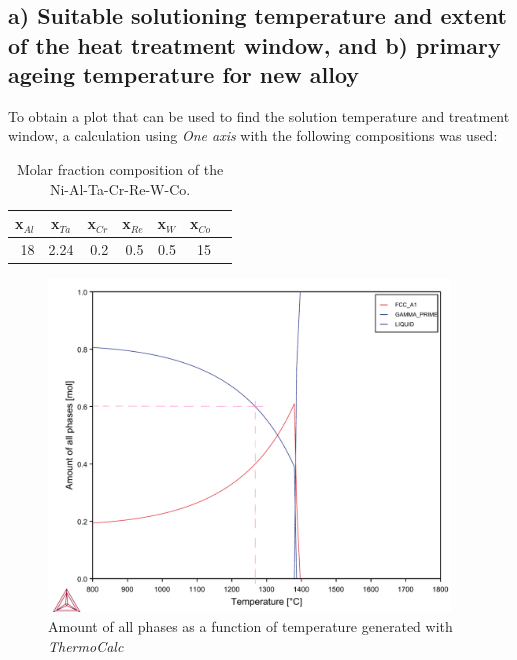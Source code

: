 \section{}

\subsection{a) Suitable solutioning temperature and extent of the heat treatment window, and b) primary ageing temperature for new alloy}

To obtain a plot that can be used to find the solution temperature and treatment window, a calculation using \textit{One axis} with the following compositions was used:

\begin{table}[h]
  \centering
  \begin{tabular}{rrrrrrr}
    \multicolumn{1}{c}{x$_{Al}$} & \multicolumn{1}{c}{x$_{Ta}$} & \multicolumn{1}{c}{x$_{Cr}$} & \multicolumn{1}{c}{x$_{Re}$} & \multicolumn{1}{c}{x$_{W}$} & \multicolumn{1}{c}{x$_{Co}$} \\ \hline \hline
    18 & 2.24 & 0.2 & 0.5 & 0.5 & 15
  \end{tabular}
  \caption{Molar fraction composition of the Ni-Al-Ta-Cr-Re-W-Co.}
  \label{tab:tab06}
\end{table}

\begin{figure}[h]
  \centering
    \includegraphics[width=0.95\textwidth]{graficas/Q4_02_1.png}
    \caption{Amount of all phases as a function of temperature generated with \textit{ThermoCalc} \citep{thermocalc}}
    \label{fig:diagram05}
\end{figure}

